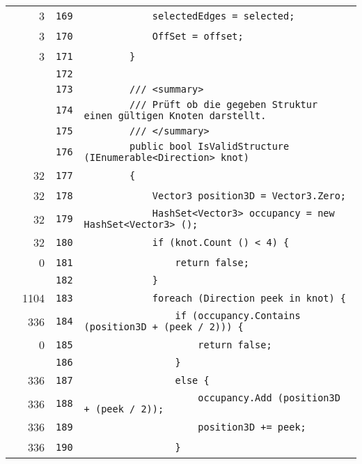 \documentclass[a4paper,10pt]{article}
\begin{document}
\begin{longtable}[l]{lrrl}
\cellcolor{green} & 3 & \verb~169~ & \verb~            selectedEdges = selected;~\\
\cellcolor{green} & 3 & \verb~170~ & \verb~            OffSet = offset;~\\
\cellcolor{green} & 3 & \verb~171~ & \verb~        }~\\
\cellcolor{gray} &  & \verb~172~ & \verb~~\\
\cellcolor{gray} &  & \verb~173~ & \verb~        /// <summary>~\\
\cellcolor{gray} &  & \verb~174~ & \verb~        /// Prüft ob die gegeben Struktur einen gültigen Knoten darstellt.~\\
\cellcolor{gray} &  & \verb~175~ & \verb~        /// </summary>~\\
\cellcolor{gray} &  & \verb~176~ & \verb~        public bool IsValidStructure (IEnumerable<Direction> knot)~\\
\cellcolor{green} & 32 & \verb~177~ & \verb~        {~\\
\cellcolor{green} & 32 & \verb~178~ & \verb~            Vector3 position3D = Vector3.Zero;~\\
\cellcolor{green} & 32 & \verb~179~ & \verb~            HashSet<Vector3> occupancy = new HashSet<Vector3> ();~\\
\cellcolor{green} & 32 & \verb~180~ & \verb~            if (knot.Count () < 4) {~\\
\cellcolor{red} & 0 & \verb~181~ & \verb~                return false;~\\
\cellcolor{gray} &  & \verb~182~ & \verb~            }~\\
\cellcolor{green} & 1104 & \verb~183~ & \verb~            foreach (Direction peek in knot) {~\\
\cellcolor{green} & 336 & \verb~184~ & \verb~                if (occupancy.Contains (position3D + (peek / 2))) {~\\
\cellcolor{red} & 0 & \verb~185~ & \verb~                    return false;~\\
\cellcolor{gray} &  & \verb~186~ & \verb~                }~\\
\cellcolor{green} & 336 & \verb~187~ & \verb~                else {~\\
\cellcolor{green} & 336 & \verb~188~ & \verb~                    occupancy.Add (position3D + (peek / 2));~\\
\cellcolor{green} & 336 & \verb~189~ & \verb~                    position3D += peek;~\\
\cellcolor{green} & 336 & \verb~190~ & \verb~                }~\\

\end{longtable}
\end{document}
